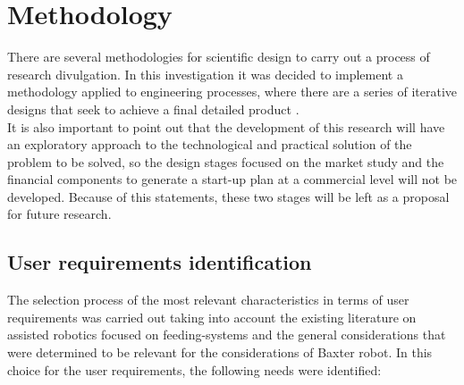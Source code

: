 \documentclass[11pt]{report} %
\begin{document}
\newpage

\chapter{Methodology}

 There are several methodologies for scientific design to carry out a process of research divulgation. In this investigation it was decided to implement a methodology applied to engineering processes, where there are a series of iterative designs that seek to achieve a final detailed product \citep{cite_dieter_engineering_design}.\\
 
It is also important to point out that the development of this research will have an exploratory approach to the technological and practical solution of the problem to be solved, so the design stages focused on the market study and the financial components to generate a start-up plan at a commercial level will not be developed. Because of this statements, these two stages will be left as a proposal for future research.\\

\section{User requirements identification}

The selection process of the most relevant characteristics in terms of user requirements was carried out taking into account the existing literature on assisted robotics focused on feeding-systems and the general considerations that were determined to be relevant for the considerations of Baxter robot. In this choice for the user requirements, the following needs were identified:\\
\end{document}
